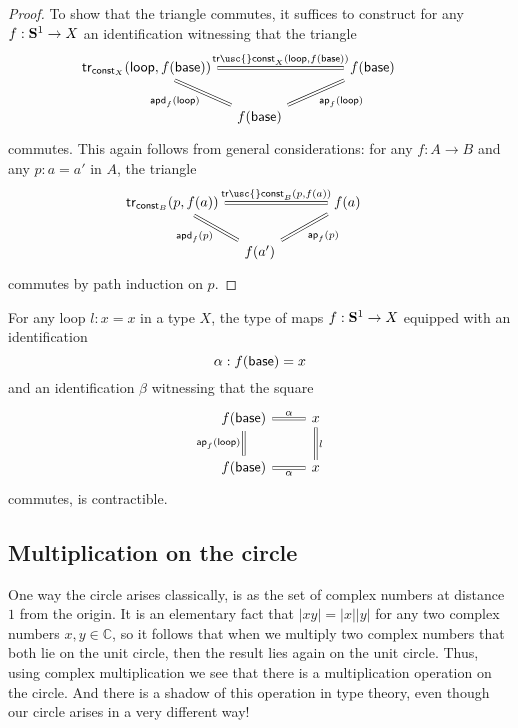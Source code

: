\begin{proof}
  To show that the triangle commutes, it suffices to construct for any $f:\mathbf{S}^{1}\to X$ an identification witnessing that the triangle
  \begin{equation*}
    \begin{tikzcd}[column sep=1em]
      \tr_{\const_X}(\lloop,f(\base)) \arrow[dr,equals,swap,"\apd{f}{\lloop}"] \arrow[rr,equals,"{\mathsf{tr\usc{}const}_X(\lloop,f(\base))}"] & & f(\base) \arrow[dl,equals,"\ap{f}{\lloop}"] \\
      & f(\base) & \phantom{\tr_{\const_X}(\lloop,f(\base))}
    \end{tikzcd}
  \end{equation*}
  commutes. This again follows from general considerations: for any $f:A\to B$ and any $p:a=a'$ in $A$, the triangle
  \begin{equation*}
    \begin{tikzcd}[column sep=1em]
      \tr_{\const_B}(p,f(a)) \arrow[dr,equals,swap,"\apd{f}{p}"] \arrow[rr,equals,"{\mathsf{tr\usc{}const}_B(p,f(a))}"] & & f(a) \arrow[dl,equals,"\ap{f}{p}"] \\
      & f(a') & \phantom{\tr_{\const_B}(p,f(a))}
    \end{tikzcd}
  \end{equation*}
  commutes by path induction on $p$.
\end{proof}

\begin{cor}
  For any loop $l:x=x$ in a type $X$, the type of maps $f:\mathbf{S}^{1}\to X$ equipped with an identification
  \begin{equation*}
    \alpha : f(\mathsf{base})=x 
  \end{equation*}
  and an identification $\beta$ witnessing that the square
  \begin{equation*}
    \begin{tikzcd}
      f(\base) \arrow[r,equals,"\alpha"] \arrow[d,equals,swap,"\ap{f}{\lloop}"] & x \arrow[d,equals,"l"] \\
      f(\base) \arrow[r,equals,swap,"\alpha"] & x
    \end{tikzcd}
  \end{equation*}
  commutes, is contractible.
\end{cor}

\subsection{Multiplication on the circle}

One way the circle arises classically, is as the set of complex numbers at distance $1$ from the origin. It is an elementary fact that $|xy|=|x||y|$ for any two complex numbers $x,y\in\mathbb{C}$, so it follows that when we multiply two complex numbers that both lie on the unit circle, then the result lies again on the unit circle. Thus, using complex multiplication we see that there is a multiplication operation on the circle. And there is a shadow of this operation in type theory, even though our circle arises in a very different way!

